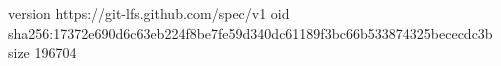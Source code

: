 version https://git-lfs.github.com/spec/v1
oid sha256:17372e690d6c63eb224f8be7fe59d340dc61189f3bc66b533874325bececdc3b
size 196704
